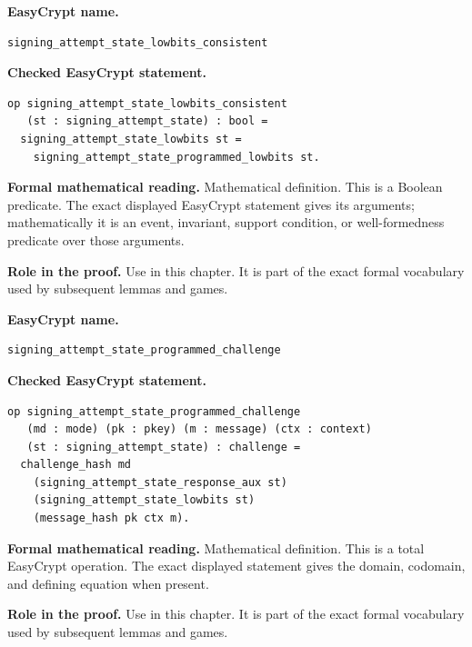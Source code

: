 \begin{formaldefinition}
\noindent\textbf{EasyCrypt name.}
\begin{lstlisting}[language=EasyCrypt,basicstyle=\ttfamily\scriptsize]
signing_attempt_state_lowbits_consistent
\end{lstlisting}
\noindent\textbf{Checked EasyCrypt statement.}
\begin{lstlisting}[language=EasyCrypt,basicstyle=\ttfamily\scriptsize]
op signing_attempt_state_lowbits_consistent
   (st : signing_attempt_state) : bool =
  signing_attempt_state_lowbits st =
    signing_attempt_state_programmed_lowbits st.
\end{lstlisting}
\noindent\textbf{Formal mathematical reading.}
Mathematical definition. This is a Boolean predicate.  The exact displayed EasyCrypt statement gives its arguments; mathematically it is an event, invariant, support condition, or well-formedness predicate over those arguments.

\noindent\textbf{Role in the proof.}
Use in this chapter. It is part of the exact formal vocabulary used by subsequent lemmas and games.

\end{formaldefinition}

\begin{formaldefinition}
\noindent\textbf{EasyCrypt name.}
\begin{lstlisting}[language=EasyCrypt,basicstyle=\ttfamily\scriptsize]
signing_attempt_state_programmed_challenge
\end{lstlisting}
\noindent\textbf{Checked EasyCrypt statement.}
\begin{lstlisting}[language=EasyCrypt,basicstyle=\ttfamily\scriptsize]
op signing_attempt_state_programmed_challenge
   (md : mode) (pk : pkey) (m : message) (ctx : context)
   (st : signing_attempt_state) : challenge =
  challenge_hash md
    (signing_attempt_state_response_aux st)
    (signing_attempt_state_lowbits st)
    (message_hash pk ctx m).
\end{lstlisting}
\noindent\textbf{Formal mathematical reading.}
Mathematical definition. This is a total EasyCrypt operation.  The exact displayed statement gives the domain, codomain, and defining equation when present.

\noindent\textbf{Role in the proof.}
Use in this chapter. It is part of the exact formal vocabulary used by subsequent lemmas and games.

\end{formaldefinition}

